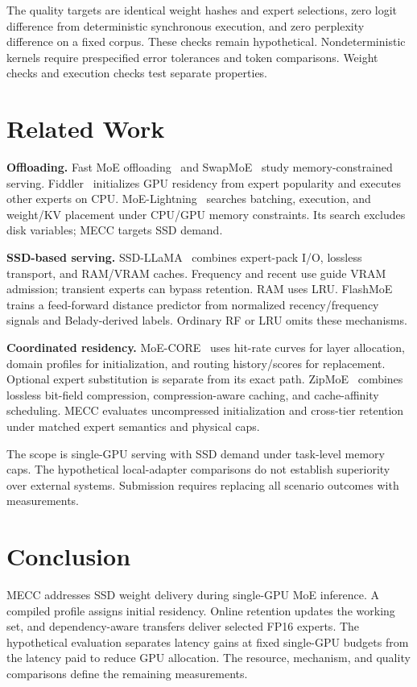 \documentclass[conference,9pt,letterpaper]{IEEEtran}
\newcommand{\mecc}{\textsc{MECC}}
\begin{document}
The quality targets are identical weight hashes and expert selections, zero logit difference from deterministic synchronous execution, and zero perplexity difference on a fixed corpus. These checks remain hypothetical. Nondeterministic kernels require prespecified error tolerances and token comparisons. Weight checks and execution checks test separate properties.

\section{Related Work}
\textbf{Offloading.} Fast MoE offloading~\cite{offloading} and SwapMoE~\cite{swapmoe} study memory-constrained serving. Fiddler~\cite{fiddler} initializes GPU residency from expert popularity and executes other experts on CPU. MoE-Lightning~\cite{lightning} searches batching, execution, and weight/KV placement under CPU/GPU memory constraints. Its search excludes disk variables; \mecc{} targets SSD demand.

\textbf{SSD-based serving.} SSD-LLaMA~\cite{ssdllama} combines expert-pack I/O, lossless transport, and RAM/VRAM caches. Frequency and recent use guide VRAM admission; transient experts can bypass retention. RAM uses LRU. FlashMoE~\cite{flashmoe} trains a feed-forward distance predictor from normalized recency/frequency signals and Belady-derived labels. Ordinary RF or LRU omits these mechanisms.

\textbf{Coordinated residency.} MoE-CORE~\cite{core} uses hit-rate curves for layer allocation, domain profiles for initialization, and routing history/scores for replacement. Optional expert substitution is separate from its exact path. ZipMoE~\cite{zipmoe} combines lossless bit-field compression, compression-aware caching, and cache-affinity scheduling. \mecc{} evaluates uncompressed initialization and cross-tier retention under matched expert semantics and physical caps.

The scope is single-GPU serving with SSD demand under task-level memory caps. The hypothetical local-adapter comparisons do not establish superiority over external systems. Submission requires replacing all scenario outcomes with measurements.

\section{Conclusion}
\mecc{} addresses SSD weight delivery during single-GPU MoE inference. A compiled profile assigns initial residency. Online retention updates the working set, and dependency-aware transfers deliver selected FP16 experts. The hypothetical evaluation separates latency gains at fixed single-GPU budgets from the latency paid to reduce GPU allocation. The resource, mechanism, and quality comparisons define the remaining measurements.
\end{document}
